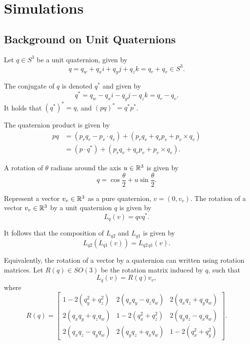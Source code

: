 \newpage

\section{Simulations}


\subsection{Background on Unit Quaternions}
Let $q\in S^3$ be a unit quaternion, given by
\begin{equation}
    q = q_w + q_x i + q_y j + q_z k  = q_r + q_v\in S^3.
\end{equation}

The conjugate of $q$ is denoted $q^*$ and given by
\begin{equation}
    q^* = q_w - q_x i - q_y j - q_z k = q_r - q_v.
\end{equation}
It holds that $(q^*)^* = q$, and $(pq)^* = q^* p^*$.

The quaternion product is given by
\begin{align}
    pq 
    &= (p_r q_r - p_v \cdot q_v) + (p_r q_v + q_r p_v + p_v \times q_v)
    \\
    &= (p\cdot q^*) + (p_r q_v + q_r p_v + p_v \times q_v).
\end{align}

A rotation of $\theta$ radians around the axis $u\in\mathbb{R}^{3}$ is given by
\begin{equation}
    q = \cos \frac{\theta}{2} + u \sin \frac{\theta}{2}.
\end{equation}

Represent a vector $v_v\in\mathbb{R}^{3}$ as a pure quaternion, $v=(0,v_v).$
The rotation of a vector $v_v\in\mathbb{R}^{3}$ by a unit quaternion $q$ is given by
\begin{equation}
    L_q(v) = q v q^*.
\end{equation}

It follows that the composition of $L_{q2}$ and $L_{q1}$ is given by
\begin{equation}
    L_{q2}(L_{q1}(v)) = L_{q2 \, q1}(v).
\end{equation}

Equivalently, the rotation of a vector by a quaternion can written using rotation matrices.
Let $R(q) \in SO(3)$ be the rotation matrix induced by $q$, such that
\begin{equation}
    L_q(v) = R(q) v_v,
\end{equation}
where
\begin{equation}
    R(q) = \begin{bmatrix}
        1-2(q_y^2 + q_z^2) & 2(q_x q_y - q_z q_w) & 2(q_x q_z + q_y q_w) \\
        2(q_x q_y + q_z q_w) & 1-2(q_x^2 + q_z^2) & 2(q_y q_z - q_x q_w) \\
        2(q_x q_z - q_y q_w) & 2(q_y q_z + q_x q_w) & 1-2(q_x^2 + q_y^2)
    \end{bmatrix}.
\end{equation}


